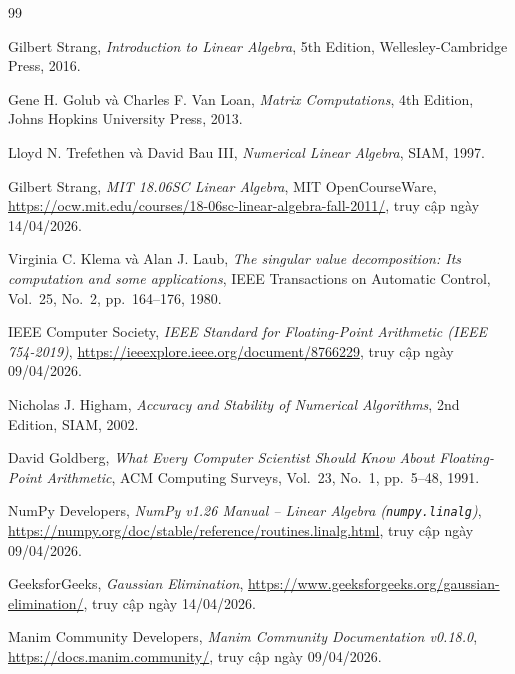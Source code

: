 \newpage
\begin{thebibliography}{99}


    Gilbert Strang, \textit{Introduction to Linear Algebra}, 5th Edition,
    Wellesley-Cambridge Press, 2016.

    Gene H. Golub và Charles F. Van Loan, \textit{Matrix Computations},
    4th Edition, Johns Hopkins University Press, 2013.

    Lloyd N. Trefethen và David Bau III, \textit{Numerical Linear Algebra},
    SIAM, 1997.

    Gilbert Strang, \textit{MIT 18.06SC Linear Algebra}, MIT OpenCourseWare, 
    \url{https://ocw.mit.edu/courses/18-06sc-linear-algebra-fall-2011/},
    truy cập ngày 14/04/2026.

    Virginia C. Klema và Alan J. Laub,
    \textit{The singular value decomposition: Its computation and some applications},
    IEEE Transactions on Automatic Control, Vol.~25, No.~2, pp.~164--176, 1980.


    IEEE Computer Society,
    \textit{IEEE Standard for Floating-Point Arithmetic (IEEE 754-2019)},
    \url{https://ieeexplore.ieee.org/document/8766229},
    truy cập ngày 09/04/2026.

    Nicholas J. Higham, \textit{Accuracy and Stability of Numerical Algorithms}, 
    2nd Edition, SIAM, 2002.

    David Goldberg, \textit{What Every Computer Scientist Should Know About Floating-Point Arithmetic}, 
    ACM Computing Surveys, Vol.~23, No.~1, pp.~5--48, 1991.


    NumPy Developers,
    \textit{NumPy v1.26 Manual -- Linear Algebra (\texttt{numpy.linalg})},
    \url{https://numpy.org/doc/stable/reference/routines.linalg.html},
    truy cập ngày 09/04/2026.

    GeeksforGeeks, \textit{Gaussian Elimination}, 
    \url{https://www.geeksforgeeks.org/gaussian-elimination/}, 
    truy cập ngày 14/04/2026.

    Manim Community Developers,
    \textit{Manim Community Documentation v0.18.0},
    \url{https://docs.manim.community/},
    truy cập ngày 09/04/2026.

\end{thebibliography}